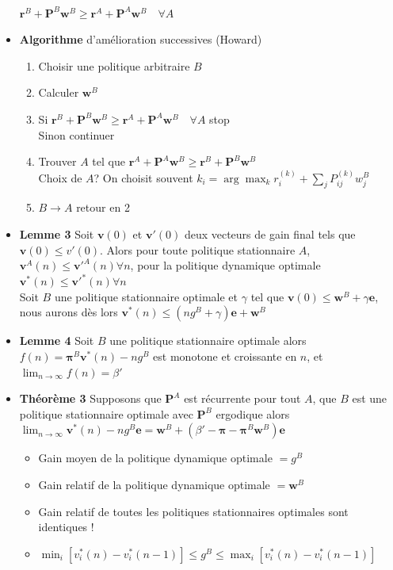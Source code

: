 \documentclass[paper=a4,fontsize=8pt,pagesize,DIV=calc]{scrartcl}
\newcounter{row}
\begin{document}
\begin{multicols}{3}
\begin{itemize}
\\$\bm{r}^B + \bm{P}^B\bm{w}^B \geq \bm{r}^A + \bm{P}^A\bm{w}^B \quad \forall A$
\item \textbf{Algorithme} d’amélioration successives (Howard)
\begin{enumerate}
\item Choisir une politique arbitraire $B$
\item Calculer $\bm{w}^B$
\item Si $\bm{r}^B + \bm{P}^B\bm{w}^B \geq \bm{r}^A + \bm{P}^A \bm{w}^B  \quad \forall A $  stop
\\Sinon continuer
\item  Trouver $A$ tel que $\bm{r}^A + \bm{P}^A\bm{w}^B \geq \bm{r}^B + \bm{P}^B\bm{w}^B$
\\ Choix de $A$? On choisit souvent $k_i=\arg \max_k r_i^{(k)}+\sum_j P_{ij}^{(k)}w_j^B$
\item $B \rightarrow A$ retour en 2
\end{enumerate}
\item \textbf{Lemme 3} Soit $\bm{v}(0)$ et $\bm{v}'(0)$ deux vecteurs de gain final tels que $\bm{v}(0) \leq v'(0)$. Alors pour toute politique stationnaire $A$, $\bm{v}^A(n) \leq \bm{v}'^A(n) \forall n$, pour la politique dynamique optimale $\bm{v}^*(n) \leq  \bm{v}'^*(n) \forall n$
\\ Soit $B$ une politique stationnaire optimale et $\gamma$ tel que $\bm{v}(0) \leq  \bm{w}^B + \gamma \bm{e}$, nous aurons dès lors $\bm{v}^*(n) \leq  (ng^B + \gamma)\bm{e} + \bm{w}^B$
\item \textbf{Lemme 4} Soit $B$ une politique stationnaire optimale alors $f(n) = \bm{\pi}^B\bm{v}^*(n) - ng^B$ est monotone et croissante en $n$, et $\lim_{n\to \infty } f(n) = \beta'$
\item \textbf{Théorème 3} Supposons que $\bm{P}^A$ est récurrente pour tout $A$, que $B$ est une politique stationnaire optimale avec $\bm{P}^B$ ergodique alors
\\ $\lim_{n\to \infty} \bm{v}^*(n) - ng^B \bm{e} = \bm{w}^B + (\beta'- \bm{\pi}-\bm{\pi}^B\bm{w}^B)\bm{e}$
\begin{itemize}
\item Gain moyen de la politique dynamique optimale $= g^B$
\item Gain relatif de la politique dynamique optimale $= \bm{w}^B$
\item Gain relatif de toutes les politiques stationnaires optimales sont identiques !
\item $\min_i[v_i^*(n) - v^*_i (n - 1)] \leq g^B \leq \max_i[v^*_i(n) - v^*_i (n - 1)]$

\end{itemize}
\end{itemize}
\end{multicols}
\end{document}
